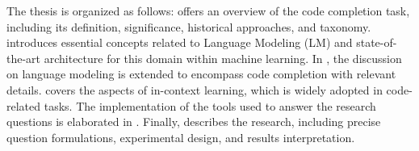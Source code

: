 The thesis is organized as follows:  offers an overview of the code completion task, including its definition, significance, historical approaches, and taxonomy.  introduces essential concepts related to Language Modeling (LM) and state-of-the-art architecture for this domain within machine learning. In , the discussion on language modeling is extended to encompass code completion with relevant details.  covers the aspects of in-context learning, which is widely adopted in code-related tasks. The implementation of the tools used to answer the research questions is elaborated in . Finally,  describes the research, including precise question formulations, experimental design, and results interpretation.
